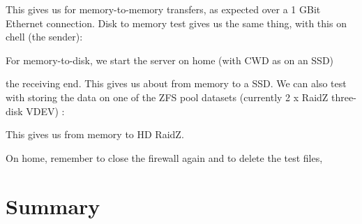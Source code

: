 \documentclass[a4paper,10pt,english]{sphinxmanual}
\begin{document}
This gives us  for memory-to-memory transfers, as expected over a
1 GBit Ethernet connection. Disk to memory test gives us the same thing, with
this on chell (the sender):

\begin{sphinxVerbatim}[commandchars=\\\{\}]
       
\end{sphinxVerbatim}

For memory-to-disk, we start the server on home (with CWD as  on an SSD)

\begin{sphinxVerbatim}[commandchars=\\\{\}]
     
\end{sphinxVerbatim}

the receiving end. This gives us about  from memory to a SSD. We can
also test with storing the data on one of the ZFS pool datasets (currently 2 x
RaidZ three-disk VDEV) :

\begin{sphinxVerbatim}[commandchars=\\\{\}]
     
\end{sphinxVerbatim}

This gives us  from memory to HD RaidZ.

On home, remember to close the firewall again and to delete the test files,

\begin{sphinxVerbatim}[commandchars=\\\{\}]
   
 
 
\end{sphinxVerbatim}


\section{Summary}
\label{\detokenize{speed:summary}}
\end{document}
